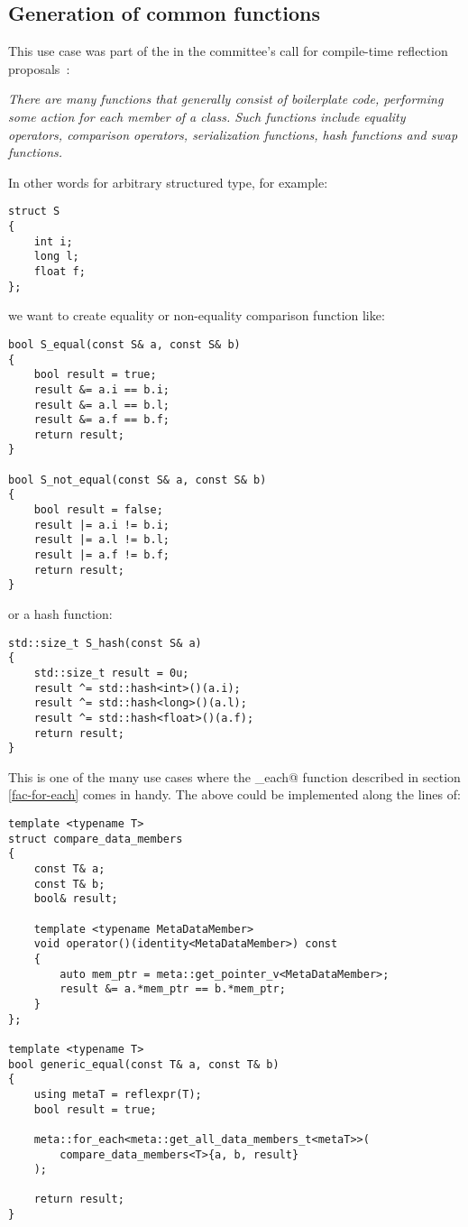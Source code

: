 \subsection{Generation of common functions}

This use case was part of the  in the committee's
call for compile-time reflection proposals~\cite{ISOCPP-N3814}: 

{\em There are many functions that generally consist of boilerplate code,
performing some action for each member of a class. Such functions include
equality operators, comparison operators, serialization functions,
hash functions and swap functions.
}

In other words for arbitrary structured type, for example:

\begin{verbatim}
struct S
{
	int i;
	long l;
	float f;
};
\end{verbatim}

we want to create equality or non-equality comparison function like:

\begin{verbatim}
bool S_equal(const S& a, const S& b)
{
	bool result = true;
	result &= a.i == b.i;
	result &= a.l == b.l;
	result &= a.f == b.f;
	return result;
}

bool S_not_equal(const S& a, const S& b)
{
	bool result = false;
	result |= a.i != b.i;
	result |= a.l != b.l;
	result |= a.f != b.f;
	return result;
}
\end{verbatim}

or a hash function:

\begin{verbatim}
std::size_t S_hash(const S& a)
{
	std::size_t result = 0u;
	result ^= std::hash<int>()(a.i);
	result ^= std::hash<long>()(a.l);
	result ^= std::hash<float>()(a.f);
	return result;
}
\end{verbatim}

This is one of the many use cases where the \verb@for_each@ function
described in section \ref{fac-for-each} comes in handy. The above could be
implemented along the lines of:

\begin{verbatim}
template <typename T>
struct compare_data_members
{
	const T& a;
	const T& b;
	bool& result;

	template <typename MetaDataMember>
	void operator()(identity<MetaDataMember>) const
	{
		auto mem_ptr = meta::get_pointer_v<MetaDataMember>;
		result &= a.*mem_ptr == b.*mem_ptr;
	}
};

template <typename T>
bool generic_equal(const T& a, const T& b)
{
	using metaT = reflexpr(T);
	bool result = true;

	meta::for_each<meta::get_all_data_members_t<metaT>>(
		compare_data_members<T>{a, b, result}
	);

	return result;
}
\end{verbatim}

